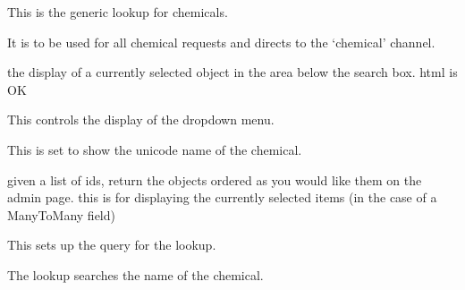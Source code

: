 \documentclass[letterpaper,10pt,english]{sphinxmanual}
\begin{document}

\begin{fulllineitems}
\label{api:experimentdb.reagents.lookups.ChemicalLookup}
This is the generic lookup for chemicals.


It is to be used for all chemical requests and directs to the `chemical' channel.


\begin{fulllineitems}
\label{api:experimentdb.reagents.lookups.ChemicalLookup.format_item}
the display of a currently selected object in the area below the search box. html is OK


\end{fulllineitems}


\begin{fulllineitems}
\label{api:experimentdb.reagents.lookups.ChemicalLookup.format_result}
This controls the display of the dropdown menu.


This is set to show the unicode name of the chemical.


\end{fulllineitems}


\begin{fulllineitems}
\label{api:experimentdb.reagents.lookups.ChemicalLookup.get_objects}
given a list of ids, return the objects ordered as you would like them on the admin page.
this is for displaying the currently selected items (in the case of a ManyToMany field)


\end{fulllineitems}


\begin{fulllineitems}
\label{api:experimentdb.reagents.lookups.ChemicalLookup.get_query}
This sets up the query for the lookup.


The lookup searches the name of the chemical.


\end{fulllineitems}


\end{fulllineitems}
\end{document}
